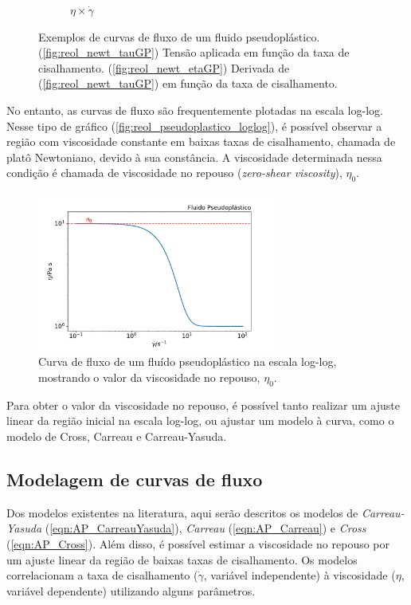 \begin{figure}[h]
\begin{subfigure}[t]{.5\textwidth}
					\caption{\(\eta \times \dot{\gamma}\)}
					\label{fig:reol_pseudo_etaGP}
				\end{subfigure}
				\caption{Exemplos de curvas de fluxo de um fluido pseudoplástico. (\ref{fig:reol_newt_tauGP}) Tensão aplicada em função da taxa de cisalhamento. (\ref{fig:reol_newt_etaGP}) Derivada de (\ref{fig:reol_newt_tauGP}) em função da taxa de cisalhamento.}
				\label{fig:reol_pseudoplastico_exemplos}
			\end{figure} 
			
			No entanto, as curvas de fluxo são frequentemente plotadas na escala log-log. Nesse tipo de gráfico (\autoref{fig:reol_pseudoplastico_loglog}), é possível observar a região com viscosidade constante em baixas taxas de cisalhamento, chamada de platô Newtoniano, devido à sua constância. A viscosidade determinada nessa condição é chamada de viscosidade no repouso (\emph{zero-shear viscosity}), \(\eta_0\).\cite{Kronberg2014a}
			
			\begin{figure}[h]
				\centering
				\includegraphics[width=0.7\textwidth]{./imagens/reologia/Pseudoplastico_loglog}
				\caption{Curva de fluxo de um fluído pseudoplástico na escala log-log, mostrando o valor da viscosidade no repouso, \(\eta_0\).}
				\label{fig:reol_pseudoplastico_loglog}
			\end{figure}
		
			Para obter o valor da viscosidade no repouso, é possível tanto realizar um ajuste linear da região inicial na escala log-log, ou ajustar um modelo à curva, como o modelo de Cross, Carreau e Carreau-Yasuda.
			
			\subsection{Modelagem de curvas de fluxo}
			\label{sec:modelagem_curva_fluxo}
			Dos modelos existentes na literatura, aqui serão descritos os modelos de \emph{Carreau-Yasuda} (\ref{eqn:AP_CarreauYasuda})\cite{Kwiatkowski2016a}, \emph{Carreau} (\autoref{eqn:AP_Carreau})\cite{Boger1989} e \emph{Cross} (\autoref{eqn:AP_Cross})\cite{Boger1989}. Além disso, é possível estimar a viscosidade no repouso por um ajuste linear da região de baixas taxas de cisalhamento. Os modelos correlacionam a taxa de cisalhamento (\(\dot{\gamma}\), variável independente) à viscosidade (\(\eta\), variável dependente) utilizando alguns parâmetros.
			
